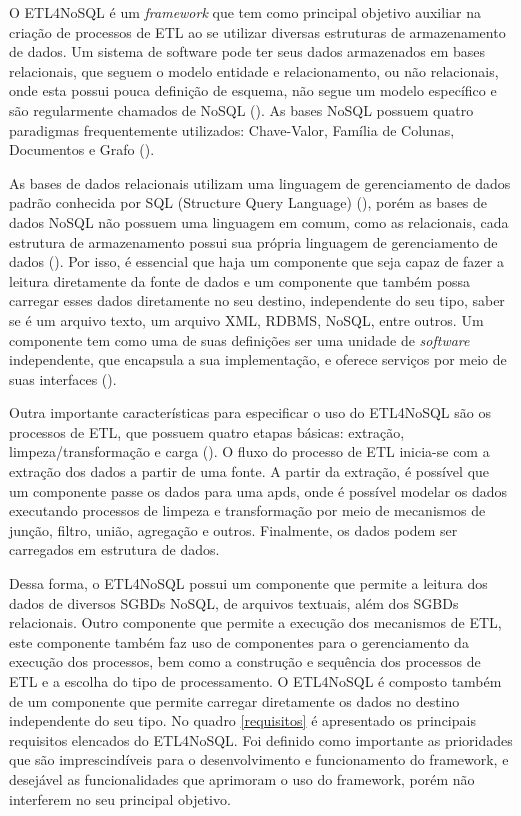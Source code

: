 O ETL4NoSQL é um \textit{framework} que tem como principal objetivo auxiliar na criação de processos de ETL ao se utilizar diversas estruturas de armazenamento de dados. Um sistema de software pode ter seus dados armazenados em bases relacionais, que seguem o modelo entidade e relacionamento, ou não relacionais, onde esta possui pouca definição de esquema, não segue um modelo específico e são regularmente chamados de NoSQL (\cite{fowler:2013}). As bases NoSQL possuem quatro paradigmas frequentemente utilizados: Chave-Valor, Família de Colunas, Documentos e Grafo (\cite{fowler:2013}).

As bases de dados relacionais utilizam uma linguagem de gerenciamento de dados padrão conhecida por SQL (Structure Query Language) (\cite{fowler:2013}), porém as bases de dados NoSQL não possuem uma linguagem em comum, como as relacionais, cada estrutura de armazenamento possui sua própria linguagem de gerenciamento de dados (\cite{fowler:2013}). Por isso, é essencial que haja um componente que seja capaz de fazer a leitura diretamente da fonte de dados e um componente que também possa carregar esses dados diretamente no seu destino, independente do seu tipo, saber se é um arquivo texto,  um arquivo XML, RDBMS, NoSQL, entre outros. Um componente tem como uma de suas definições ser uma unidade de \textit{software} independente, que encapsula a sua implementação, e oferece serviços por meio de suas interfaces (\cite{itana:2005}).

Outra importante características para especificar o uso do ETL4NoSQL são os processos de ETL, que possuem quatro etapas básicas: extração, limpeza/transformação e carga (\cite{kimball:2004}). O fluxo do processo de ETL inicia-se com a extração dos dados a partir de uma fonte. A partir da extração, é possível que um componente passe os dados para uma \acp{apd}, onde é possível modelar os dados executando processos de limpeza e transformação por meio de mecanismos de junção, filtro, união, agregação e outros. Finalmente, os dados podem ser carregados em estrutura de dados.

Dessa forma, o ETL4NoSQL possui um componente que permite a leitura dos dados de diversos SGBDs NoSQL, de arquivos textuais, além dos SGBDs relacionais. Outro componente que permite a execução dos mecanismos de ETL, este componente também faz uso de componentes para o gerenciamento da execução dos processos, bem como a construção e sequência dos processos de ETL e a escolha do tipo de processamento. O ETL4NoSQL é composto também de um componente que permite carregar diretamente os dados no destino independente do seu tipo. No quadro \ref{requisitos} é apresentado os principais requisitos elencados do ETL4NoSQL. Foi definido como importante as prioridades que são imprescindíveis para o desenvolvimento e funcionamento do framework, e desejável as funcionalidades que aprimoram o uso do framework, porém não interferem no seu principal objetivo.

